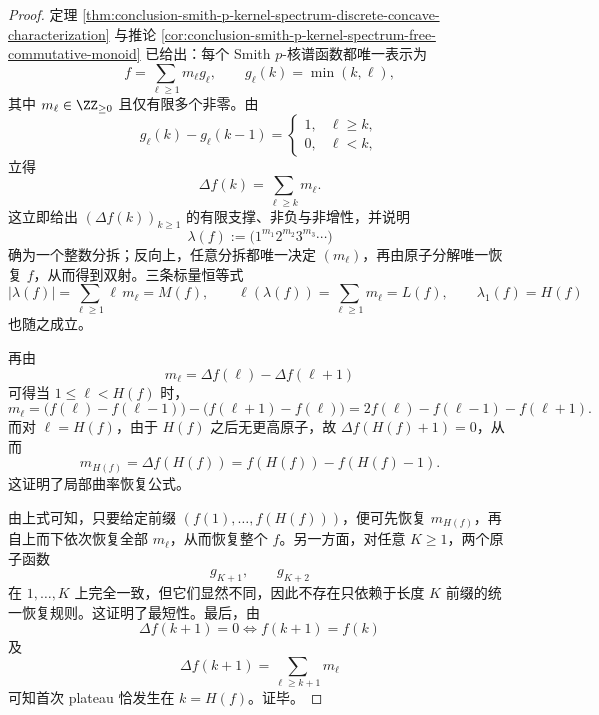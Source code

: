 \begin{proof}
定理 \ref{thm:conclusion-smith-p-kernel-spectrum-discrete-concave-characterization} 与推论 \ref{cor:conclusion-smith-p-kernel-spectrum-free-commutative-monoid} 已给出：每个 Smith \(p\)-核谱函数都唯一表示为
\[
f=\sum_{\ell\ge 1}m_\ell g_\ell,
\qquad
g_\ell(k)=\min(k,\ell),
\]
其中 \(m_\ell\in \ZZ_{\ge 0}\) 且仅有限多个非零。由
\[
g_\ell(k)-g_\ell(k-1)=
\begin{cases}
1,& \ell\ge k,\\
0,& \ell<k,
\end{cases}
\]
立得
\[
\Delta f(k)=\sum_{\ell\ge k}m_\ell.
\]
这立即给出 \((\Delta f(k))_{k\ge 1}\) 的有限支撑、非负与非增性，并说明
\[
\lambda(f):=\bigl(1^{m_1}2^{m_2}3^{m_3}\cdots\bigr)
\]
确为一个整数分拆；反向上，任意分拆都唯一决定 \((m_\ell)\)，再由原子分解唯一恢复 \(f\)，从而得到双射。三条标量恒等式
\[
|\lambda(f)|=\sum_{\ell\ge 1}\ell\,m_\ell=M(f),
\qquad
\ell(\lambda(f))=\sum_{\ell\ge 1}m_\ell=L(f),
\qquad
\lambda_1(f)=H(f)
\]
也随之成立。

再由
\[
m_\ell=\Delta f(\ell)-\Delta f(\ell+1)
\]
可得当 \(1\le \ell<H(f)\) 时，
\[
m_\ell
=
\bigl(f(\ell)-f(\ell-1)\bigr)-\bigl(f(\ell+1)-f(\ell)\bigr)
=
2f(\ell)-f(\ell-1)-f(\ell+1).
\]
而对 \(\ell=H(f)\)，由于 \(H(f)\) 之后无更高原子，故 \(\Delta f(H(f)+1)=0\)，从而
\[
m_{H(f)}=\Delta f(H(f))=f(H(f))-f(H(f)-1).
\]
这证明了局部曲率恢复公式。

由上式可知，只要给定前缀 \((f(1),\dots,f(H(f)))\)，便可先恢复 \(m_{H(f)}\)，再自上而下依次恢复全部 \(m_\ell\)，从而恢复整个 \(f\)。另一方面，对任意 \(K\ge 1\)，两个原子函数
\[
g_{K+1},
\qquad
g_{K+2}
\]
在 \(1,\dots,K\) 上完全一致，但它们显然不同，因此不存在只依赖于长度 \(K\) 前缀的统一恢复规则。这证明了最短性。最后，由
\[
\Delta f(k+1)=0
\iff
f(k+1)=f(k)
\]
及
\[
\Delta f(k+1)=\sum_{\ell\ge k+1}m_\ell
\]
可知首次 plateau 恰发生在 \(k=H(f)\)。证毕。
\end{proof}


